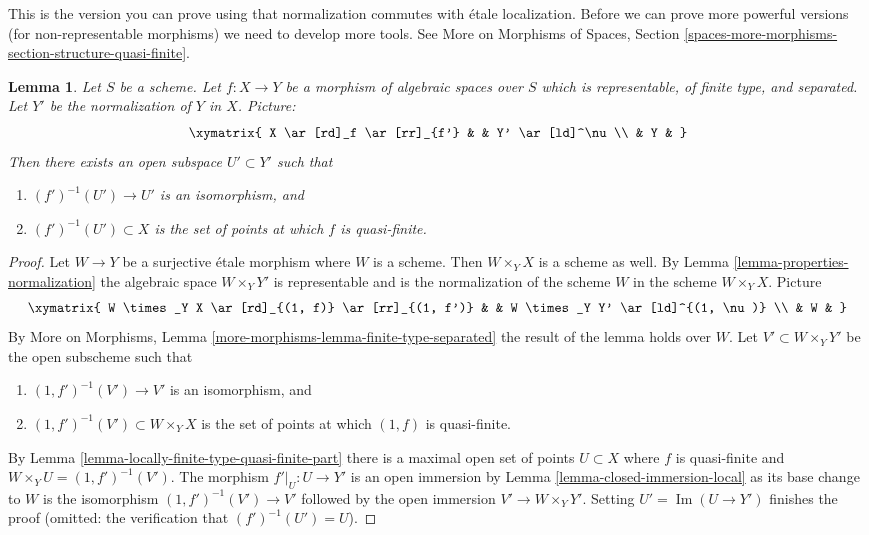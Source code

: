 \documentclass{stacks-project}
\theoremstyle{plain}
\newtheorem{lemma}[subsection]{Lemma}
\theoremstyle{definition}
\theoremstyle{remark}
\numberwithin{equation}{subsection}
\def\Im{\mathop{\mathrm{Im}}}
\begin{document}
\noindent
This is the version you can prove using that normalization
commutes with \'etale localization. Before we can prove more
powerful versions (for non-representable morphisms) we need to
develop more tools. See
More on Morphisms of Spaces, Section
\ref{spaces-more-morphisms-section-structure-quasi-finite}.

\begin{lemma}
\label{lemma-finite-type-separated}
Let $S$ be a scheme. Let $f : X \to Y$ be a morphism of algebraic
spaces over $S$ which is representable, of finite type, and separated.
Let $Y'$ be the normalization of $Y$ in $X$. Picture:
$$
\xymatrix{
X \ar[rd]_f \ar[rr]_{f'} & & Y' \ar[ld]^\nu \\
& Y &
}
$$
Then there exists an open subspace $U' \subset Y'$ such that
\begin{enumerate}
\item $(f')^{-1}(U') \to U'$ is an isomorphism, and
\item $(f')^{-1}(U') \subset X$ is the set of points at which
$f$ is quasi-finite.
\end{enumerate}
\end{lemma}

\begin{proof}
Let $W \to Y$ be a surjective \'etale morphism where $W$ is a scheme.
Then $W \times_Y X$ is a scheme as well. By
Lemma \ref{lemma-properties-normalization}
the algebraic space $W \times_Y Y'$ is representable and is
the normalization of the scheme $W$ in the scheme $W \times_Y X$. Picture
$$
\xymatrix{
W \times_Y X \ar[rd]_{(1, f)} \ar[rr]_{(1, f')} & &
W \times_Y Y' \ar[ld]^{(1, \nu)} \\
& W &
}
$$
By More on Morphisms, Lemma \ref{more-morphisms-lemma-finite-type-separated}
the result of the lemma holds over $W$. Let $V' \subset W \times_Y Y'$
be the open subscheme such that
\begin{enumerate}
\item $(1, f')^{-1}(V') \to V'$ is an isomorphism, and
\item $(1, f')^{-1}(V') \subset W \times_Y X$ is the set of points at which
$(1, f)$ is quasi-finite.
\end{enumerate}
By Lemma \ref{lemma-locally-finite-type-quasi-finite-part}
there is a maximal open set of points $U \subset X$ where $f$
is quasi-finite and $W \times_Y U = (1, f')^{-1}(V')$.
The morphism $f'|_U : U \to Y'$ is an open immersion
by Lemma \ref{lemma-closed-immersion-local}
as its base change to $W$ is the isomorphism $(1, f')^{-1}(V') \to V'$
followed by the open immersion $V' \to W \times_Y Y'$.
Setting $U' = \Im(U \to Y')$ finishes the proof
(omitted: the verification that $(f')^{-1}(U') = U$).
\end{proof}
\end{document}
